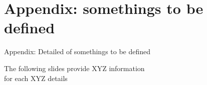 \documentclass[aspectratio=169]{beamer}
\begin{document}
\section*{Appendix: somethings to be defined}


\begin{frame}{Appendix: Detailed of somethings to be defined}

\vspace{-0.6cm}
\begin{center}
\Large The following slides provide XYZ information \\
for each XYZ details
\end{center}

\end{frame}
\end{document}
